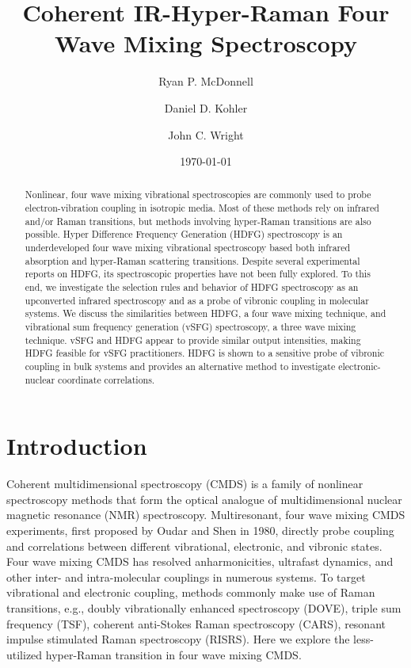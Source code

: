 \documentclass[aip, jcp, reprint, onecolumn, nofootinbib]{revtex4-2}
\begin{document}
\title{Coherent IR-Hyper-Raman Four Wave Mixing Spectroscopy}


\author{Ryan P. McDonnell} 
\author{Daniel D. Kohler}
\author{John C. Wright} 


\date{\today}

\begin{abstract}
Nonlinear, four wave mixing vibrational spectroscopies are commonly used to probe electron-vibration coupling in isotropic media.
Most of these methods rely on infrared and/or Raman transitions, but methods involving hyper-Raman transitions are also possible. 
Hyper Difference Frequency Generation (HDFG) spectroscopy is an underdeveloped four wave mixing vibrational spectroscopy based both infrared absorption and hyper-Raman scattering transitions. 
Despite several experimental reports on HDFG, its spectroscopic properties have not been fully explored. 
To this end, we investigate the selection rules and behavior of HDFG spectroscopy as an upconverted infrared spectroscopy and as a probe of vibronic coupling in molecular systems.
We discuss the similarities between HDFG, a four wave mixing technique, and vibrational sum frequency generation (vSFG) spectroscopy, a three wave mixing technique. 
vSFG and HDFG appear to provide similar output intensities, making HDFG feasible for vSFG practitioners.
HDFG is shown to a sensitive probe of vibronic coupling in bulk systems and provides an alternative method to investigate electronic-nuclear coordinate correlations.
\end{abstract}

\maketitle

\section{Introduction}
Coherent multidimensional spectroscopy (CMDS) is a family of nonlinear spectroscopy methods that form the optical analogue of multidimensional nuclear magnetic resonance (NMR) spectroscopy.\cite{Cho2008}
Multiresonant, four wave mixing CMDS experiments, first proposed by Oudar and Shen in 1980,\cite{RN307} directly probe coupling and correlations between different vibrational, electronic, and vibronic states. \cite{RN281, RN103, Cho2008} 
Four wave mixing CMDS has resolved anharmonicities, ultrafast dynamics, and other inter- and intra-molecular couplings in numerous systems. \cite{Cho2008, Gaynor2017, Ziegler2018, Ogilvie2019, Bonn2021, RN325, Chen2024}
To target vibrational and electronic coupling, methods commonly make use of Raman transitions, e.g., doubly vibrationally enhanced spectroscopy (DOVE), triple sum frequency (TSF), coherent anti-Stokes Raman spectroscopy (CARS), resonant impulse stimulated Raman spectroscopy (RISRS).\cite{RN103, Dhar1994, RN345, Cho2000, RN491}
Here we explore the less-utilized hyper-Raman transition in four wave mixing CMDS.
\end{document}
